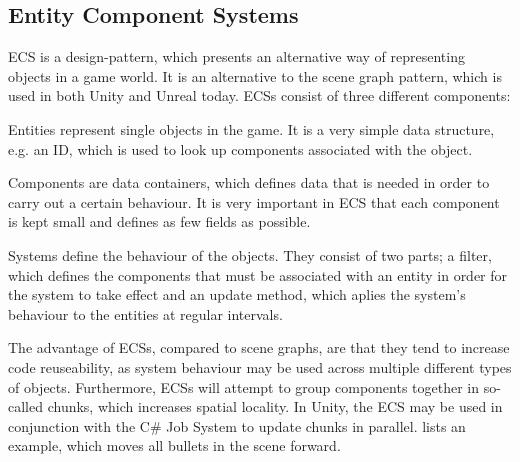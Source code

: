 \subsection{Entity Component Systems}
\gls{ECS} is a design-pattern, which presents an alternative way of representing objects in a game world. It is an alternative to the scene graph pattern\cite{scene:graph}, which is used in both Unity and Unreal today. \glspl{ECS} consist of three different components\cite{unity:ecs,ecs:general}:
\begin{labeling}{\quad\quad}
    \item[Entities] represent single objects in the game. It is a very simple data structure, e.g. an ID, which is used to look up components associated with the object.
    \item[Components] are data containers, which defines data that is needed in order to carry out a certain behaviour. It is very important in \gls{ECS} that each component is kept small and defines as few fields as possible.
    \item[Systems] define the behaviour of the objects. They consist of two parts; a filter, which defines the components that must be associated with an entity in order for the system to take effect and an update method, which aplies the system's behaviour to the entities at regular intervals.
\end{labeling}

The advantage of \glspl{ECS}, compared to scene graphs, are that they tend to increase code reuseability, as system behaviour may be used across multiple different types of objects. Furthermore, \glspl{ECS} will attempt to group components together in so-called chunks, which increases spatial locality. In Unity, the \gls{ECS} may be used in conjunction with the C\# Job System to update chunks in parallel\cite{unity:ecs}.  lists an example, which moves all bullets in the scene forward.

